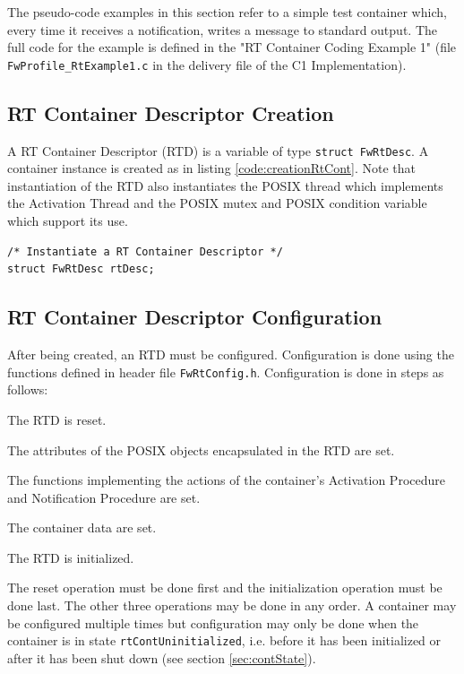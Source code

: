 \documentclass[manual]{../fwprofile}
\begin{document}
The pseudo-code examples in this section refer to a simple test container which, every time it receives a notification, writes a message to standard output. The full code for the example is defined in the "RT Container Coding Example 1" (file \texttt{FwProfile\_RtExample1.c} in the delivery file of the C1 Implementation).  

\subsection{RT Container Descriptor Creation}\label{sec:rtCreation}
A RT Container Descriptor (RTD) is a variable of type \texttt{struct FwRtDesc}. A container instance is created as in listing \ref{code:creationRtCont}.
Note that instantiation of the RTD also instantiates the POSIX thread which implements the Activation Thread and the POSIX mutex and POSIX condition variable which support its use. 

\begin{lstlisting}
/* Instantiate a RT Container Descriptor */
struct FwRtDesc rtDesc;
\end{lstlisting}

 
\subsection{RT Container Descriptor Configuration}\label{sec:rtConfiguration}
After being created, an RTD must be configured. Configuration is done using the functions defined in header file \texttt{FwRtConfig.h}. Configuration is done in steps as follows:

\begin{fw_enumerate}
\item The RTD is reset.  
\item The attributes of the POSIX objects encapsulated in the RTD are set.
\item The functions implementing the actions of the container's Activation Procedure and Notification Procedure are set.
\item The container data are set.
\item The RTD is initialized.  
\end{fw_enumerate}

The reset operation must be done first and the initialization operation must be done last. The other three operations may be done in any order. A container may be configured multiple times but configuration may only be done when the container is in state \texttt{rtContUninitialized}, i.e. before it has been initialized or after it has been shut down (see section \ref{sec:contState}). 
\end{document}
